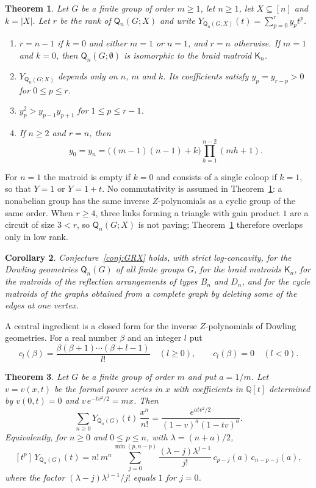 \documentclass[11pt]{amsart}
\newtheorem{theorem}{Theorem}[section]
\newtheorem{corollary}[theorem]{Corollary}
\theoremstyle{definition}
\theoremstyle{remark}
\numberwithin{equation}{section}
\newcommand{\Q}{\mathsf{Q}}
\newcommand{\K}{\mathsf{K}}
\begin{document}
\begin{theorem}\label{thm:main}
Let $G$ be a finite group of order $m\ge1$, let $n\ge1$, let $X\subseteq[n]$ and $k=|X|$. Let $r$ be the rank of $\Q_n(G;X)$ and write $Y_{\Q_n(G;X)}(t)=\sum_{p=0}^{r}y_pt^p$.
\begin{enumerate}[label=\textup{(\roman*)}]
\item $r=n-1$ if $k=0$ and either $m=1$ or $n=1$, and $r=n$ otherwise. If $m=1$ and $k=0$, then $\Q_n(G;\emptyset)$ is isomorphic to the braid matroid $\K_n$.
\item $Y_{\Q_n(G;X)}$ depends only on $n$, $m$ and $k$. Its coefficients satisfy $y_p=y_{r-p}>0$ for $0\le p\le r$.
\item $y_p^2>y_{p-1}y_{p+1}$ for $1\le p\le r-1$.
\item If $n\ge2$ and $r=n$, then
\[
y_0=y_n=\bigl((m-1)(n-1)+k\bigr)\prod_{h=1}^{n-2}(mh+1).
\]
\end{enumerate}
\end{theorem}

For $n=1$ the matroid is empty if $k=0$ and consists of a single coloop if $k=1$, so that $Y=1$ or $Y=1+t$. No commutativity is assumed in Theorem~\ref{thm:main}: a nonabelian group has the same inverse $Z$-polynomials as a cyclic group of the same order. When $r\ge4$, three links forming a triangle with gain product $1$ are a circuit of size $3<r$, so $\Q_n(G;X)$ is not paving; Theorem~\ref{thm:main} therefore overlaps \cite[Theorem~1.6]{GRX25} only in low rank.

\begin{corollary}\label{cor:families}
Conjecture~\textup{\ref{conj:GRX}} holds, with strict log-concavity, for the Dowling geometries $\Q_n(G)$ of all finite groups $G$, for the braid matroids $\K_n$, for the matroids of the reflection arrangements of types $B_n$ and $D_n$, and for the cycle matroids of the graphs obtained from a complete graph by deleting some of the edges at one vertex.
\end{corollary}

A central ingredient is a closed form for the inverse $Z$-polynomials of Dowling geometries. For a real number $\beta$ and an integer $l$ put
\[
c_l(\beta)=\frac{\beta(\beta+1)\cdots(\beta+l-1)}{l!}\quad(l\ge0),\qquad c_l(\beta)=0\quad(l<0).
\]

\begin{theorem}\label{thm:dowling-gf}
Let $G$ be a finite group of order $m$ and put $a=1/m$. Let $v=v(x,t)$ be the formal power series in $x$ with coefficients in $\mathbb{Q}[t]$ determined by $v(0,t)=0$ and $v\,e^{-tv^2/2}=mx$. Then
\[
\sum_{n\ge0}Y_{\Q_n(G)}(t)\,\frac{x^n}{n!}=\frac{e^{atv^2/2}}{(1-v)^a(1-tv)^a}.
\]
Equivalently, for $n\ge0$ and $0\le p\le n$, with $\lambda=(n+a)/2$,
\[
[t^p]\,Y_{\Q_n(G)}(t)=n!\,m^n\sum_{j=0}^{\min(p,n-p)}\frac{(\lambda-j)\lambda^{j-1}}{j!}\,c_{p-j}(a)\,c_{n-p-j}(a),
\]
where the factor $(\lambda-j)\lambda^{j-1}/j!$ equals $1$ for $j=0$.
\end{theorem}
\end{document}
